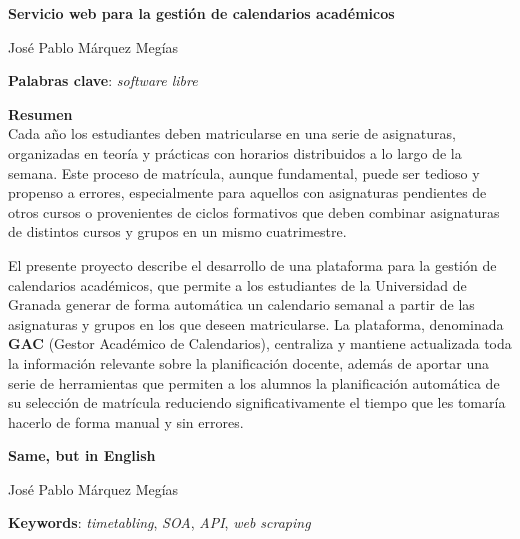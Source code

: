 \thispagestyle{empty}

\begin{center}
{\large\bfseries Servicio web para la gestión de calendarios académicos}\\
\end{center}
\begin{center}
José Pablo Márquez Megías\\
\end{center}


\vspace{0.5cm}
\noindent\textbf{Palabras clave}: \textit{software libre}
\vspace{0.7cm}

\noindent\textbf{Resumen}\\

Cada año los estudiantes deben matricularse en una serie de asignaturas, organizadas en teoría y prácticas con horarios distribuidos a lo largo de la semana. Este proceso de matrícula, aunque fundamental, puede ser tedioso y propenso a errores, especialmente para aquellos con asignaturas pendientes de otros cursos o provenientes de ciclos formativos que deben combinar asignaturas de distintos cursos y grupos en un mismo cuatrimestre.\newline

El presente proyecto describe el desarrollo de una plataforma para la gestión de calendarios académicos, que permite a los estudiantes de la Universidad de Granada generar de forma automática un calendario semanal a partir de las asignaturas y grupos en los que deseen matricularse. La plataforma, denominada \textbf{GAC} (Gestor Académico de Calendarios), centraliza y mantiene actualizada toda la información relevante sobre la planificación docente, además de aportar una serie de herramientas que permiten a los alumnos la planificación automática de su selección de matrícula reduciendo significativamente el tiempo que les tomaría hacerlo de forma manual y sin errores.\newline
	

\cleardoublepage

\begin{center}
	{\large\bfseries Same, but in English}\\
\end{center}
\begin{center}
	José Pablo Márquez Megías\\
\end{center}
\vspace{0.5cm}
\noindent\textbf{Keywords}: \textit{timetabling}, \textit{SOA}, \textit{API}, \textit{web scraping}
\vspace{0.7cm}

